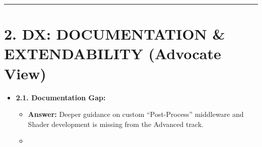 \begin{itemize}
\begin{itemize}
  \end{itemize}
\end{itemize}

\begin{center}\rule{0.5\linewidth}{0.5pt}\end{center}

\section{2. DX: DOCUMENTATION \& EXTENDABILITY (Advocate View)}\label{record-413-dx-documentation-extendability-advocate-view}

\begin{itemize}
\tightlist
\item
  \textbf{2.1. Documentation Gap:}

  \begin{itemize}
  \tightlist
  \item
    \textbf{Answer:} Deeper guidance on custom ``Post-Process'' middleware and Shader development is missing from the Advanced track.
  \item

\end{itemize}
\end{itemize}
